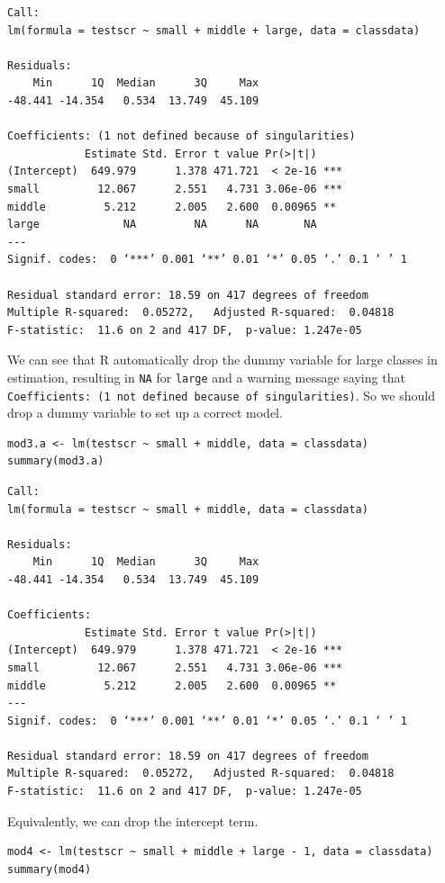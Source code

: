 \documentclass[11pt]{article}
\begin{document}
\begin{verbatim}
Call:
lm(formula = testscr ~ small + middle + large, data = classdata)

Residuals:
    Min      1Q  Median      3Q     Max
-48.441 -14.354   0.534  13.749  45.109

Coefficients: (1 not defined because of singularities)
            Estimate Std. Error t value Pr(>|t|)
(Intercept)  649.979      1.378 471.721  < 2e-16 ***
small         12.067      2.551   4.731 3.06e-06 ***
middle         5.212      2.005   2.600  0.00965 **
large             NA         NA      NA       NA
---
Signif. codes:  0 ‘***’ 0.001 ‘**’ 0.01 ‘*’ 0.05 ‘.’ 0.1 ‘ ’ 1

Residual standard error: 18.59 on 417 degrees of freedom
Multiple R-squared:  0.05272,	Adjusted R-squared:  0.04818
F-statistic:  11.6 on 2 and 417 DF,  p-value: 1.247e-05
\end{verbatim}

We can see that R automatically drop the dummy variable for large
classes in estimation, resulting in \texttt{NA} for \texttt{large} and a warning
message saying that \texttt{Coefficients: (1 not defined because of
singularities)}. So we should drop a dummy variable to set up a correct
model.

\begin{verbatim}
mod3.a <- lm(testscr ~ small + middle, data = classdata)
summary(mod3.a)
\end{verbatim}

\begin{verbatim}
Call:
lm(formula = testscr ~ small + middle, data = classdata)

Residuals:
    Min      1Q  Median      3Q     Max
-48.441 -14.354   0.534  13.749  45.109

Coefficients:
            Estimate Std. Error t value Pr(>|t|)
(Intercept)  649.979      1.378 471.721  < 2e-16 ***
small         12.067      2.551   4.731 3.06e-06 ***
middle         5.212      2.005   2.600  0.00965 **
---
Signif. codes:  0 ‘***’ 0.001 ‘**’ 0.01 ‘*’ 0.05 ‘.’ 0.1 ‘ ’ 1

Residual standard error: 18.59 on 417 degrees of freedom
Multiple R-squared:  0.05272,	Adjusted R-squared:  0.04818
F-statistic:  11.6 on 2 and 417 DF,  p-value: 1.247e-05
\end{verbatim}

Equivalently, we can drop the intercept term.
\begin{verbatim}
mod4 <- lm(testscr ~ small + middle + large - 1, data = classdata)
summary(mod4)
\end{verbatim}
\end{document}
